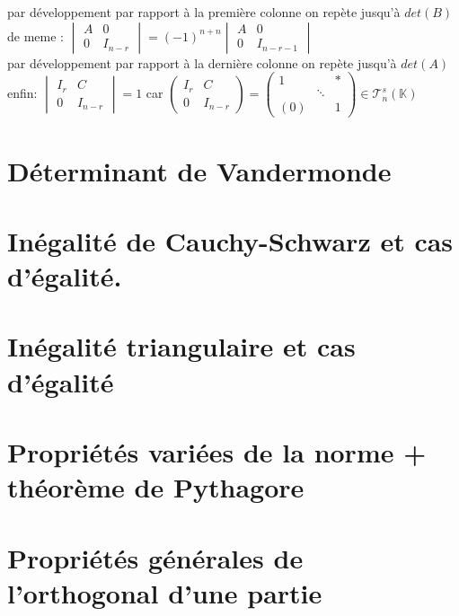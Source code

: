 \documentclass{article}
\begin{document}
    par développement par rapport à la première colonne on repète jusqu'à $det(B)$ \\
    de meme : $\begin{vmatrix} A & 0 \\ 0 & I_{n-r} \end{vmatrix}= (-1)^{n+n} \begin{vmatrix} A & 0 \\ 0 & I_{n-r-1} \end{vmatrix}$ \\
      par développement par rapport à la dernière colonne on repète jusqu'à $det(A)$ \\
      enfin: $\begin{vmatrix} I_r& C \\ 0 & I_{n-r} \end{vmatrix}=1$ car $\begin{pmatrix} I_r & C \\ 0 & I_{n-r} \end{pmatrix}= \begin{pmatrix} 1& & \ast \\  & \ddots \\ (0) & & 1 \end{pmatrix} \in \mathcal T^s_n(\mathbb K)$
\section{Déterminant de Vandermonde}
\section{Inégalité de Cauchy-Schwarz et cas d'égalité.}
\section{Inégalité triangulaire et cas d'égalité}
\section{Propriétés variées de la norme + théorème de Pythagore}
\section{Propriétés générales de l'orthogonal d'une partie}
\end{document}

